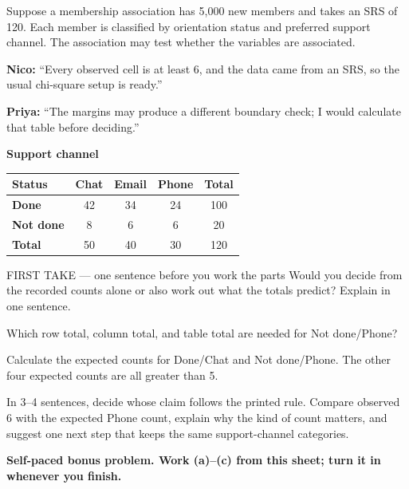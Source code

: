\documentclass[14pt]{extarticle}
\begin{document}
\pagestyle{empty}


\noindent\begin{minipage}[t]{0.57\linewidth}
\vspace{0pt}
Suppose a membership association has 5,000 new members and takes an SRS of 120. Each member is classified by orientation status and preferred support channel. The association may test whether the variables are associated.\par\smallskip \textbf{Nico:} ``Every observed cell is at least 6, and the data came from an SRS, so the usual chi-square setup is ready.''\par \textbf{Priya:} ``The margins may produce a different boundary check; I would calculate that table before deciding.''\par
\end{minipage}\hfill
\begin{minipage}[t]{0.40\linewidth}
\vspace{0pt}
\begin{center}
\textbf{Support channel}\par\smallskip
\begin{tabular}{|l|c|c|c|c|}
\hline
\textbf{Status} & \textbf{Chat} & \textbf{Email} & \textbf{Phone} & \textbf{Total} \\ \hline
\textbf{Done} & 42 & 34 & 24 & 100 \\ \hline
\textbf{Not done} & 8 & 6 & 6 & 20 \\ \hline
\textbf{Total} & 50 & 40 & 30 & 120 \\ \hline
\end{tabular}
\end{center}
\end{minipage}

\begin{firsttakebox}{FIRST TAKE --- one sentence before you work the parts}
Would you decide from the recorded counts alone or also work out what the totals predict? Explain in one sentence.
\end{firsttakebox}

\begin{description}[leftmargin=1.15in, labelwidth=1in, itemsep=2pt, topsep=2pt]
  \item[\dokbadge{1}~(a)] Which row total, column total, and table total are needed for Not done/Phone?
  \item[\dokbadge{2}~(b)] Calculate the expected counts for Done/Chat and Not done/Phone. The other four expected counts are all greater than 5.
  \item[\dokbadge{3}~(c)] In 3--4 sentences, decide whose claim follows the printed rule. Compare observed 6 with the expected Phone count, explain why the kind of count matters, and suggest one next step that keeps the same support-channel categories.
\end{description}

\vfill
\textbf{Self-paced bonus problem. Work (a)--(c) from this sheet; turn it in whenever you finish.}
\end{document}

